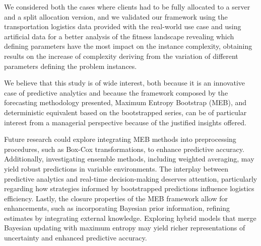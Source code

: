 \documentclass[ijoc,sglanonrev]{informs4}
\begin{document}
We considered both the cases where clients had to be fully allocated to a server and a split allocation version, and we  validated our framework using the transportation logistics data provided with the real-world use case and using artificial data for a better analysis of the fitness landscape revealing which defining parameters have the most impact on the instance complexity, obtaining results on the increase of complexity deriving from the variation of different parameters defining the problem instances.

We believe that this study is of wide interest, both because it is an innovative case of predictive analytics and because the framework composed by the forecasting methodology presented, Maximum Entropy Bootstrap (MEB), and deterministic equivalent based on the bootstrapped series, can be of particular interest from a managerial perspective because of the justified insights offered.

Future research could explore integrating MEB methods into preprocessing procedures, such as Box-Cox transformations, to enhance predictive accuracy. Additionally, investigating ensemble methods, including weighted averaging, may yield robust predictions in variable environments. The interplay between predictive analytics and real-time decision-making deserves attention, particularly regarding how strategies informed by bootstrapped predictions influence logistics efficiency. Lastly, the closure properties of the MEB framework allow for enhancements, such as incorporating Bayesian prior information, refining estimates by integrating external knowledge. Exploring hybrid models that merge Bayesian updating with maximum entropy may yield richer representations of uncertainty and enhanced predictive accuracy.

\end{document}
